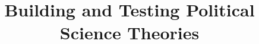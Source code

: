 
\usepackage{tikz}
\usetikzlibrary{shapes,arrows}

\title{Building and Testing Political Science Theories}


\date[]{}



\frame{\titlepage}

\frame{\tableofcontents}


\frame{\tableofcontents[currentsection]}




\appendix
\frame{}


